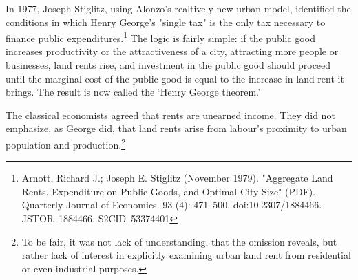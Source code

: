   
  In 1977, Joseph Stiglitz, using Alonzo's realtively new urban model, identified the conditions in which Henry George's "single tax" is  the only tax necessary to finance public expenditures.\footnote{Arnott, Richard J.; Joseph E. Stiglitz (November 1979). "Aggregate Land Rents, Expenditure on Public Goods, and Optimal City Size" (PDF). Quarterly Journal of Economics. 93 (4): 471–500. doi:10.2307/1884466. JSTOR 1884466. S2CID 53374401 }   The logic is fairly simple: if the public good increases productivity or the attractiveness of a city, attracting more people or businesses, land rents rise, and investment in the public good should proceed until the marginal cost of the public good is equal to the increase in land rent it brings. The result is now called the `Henry George theorem.'



The classical economists agreed that rents are unearned income. They did not emphasize, as George did, that land rents arise from labour's proximity to urban population and production.\footnote{To be fair, it was not lack of understanding, that the omission reveals, but rather lack of interest in explicitly examining urban land rent from residential or even industrial purposes.}%





